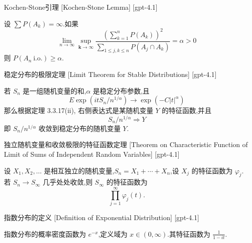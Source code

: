 \documentclass[UTF8]{ctexart}
\begin{document}
    
    
    \begin{lma}
        {Kochen-Stone引理}
        [Kochen-Stone Lemma]
        [gpt-4.1]
        
设 $\sum P(A_k) = \infty$.如果
\[
\lim_{n \to \infty} \sup_{\mathbf{k} \to \infty} \frac{\left( \sum_{k=1}^{n} P(A_k) \right)^2}{\sum_{1 \leq j, k \leq n} P(A_j \cap A_k)} = \alpha > 0
\]
则 $P(A_n\ \text{i.o.}) \geq \alpha$.

    \end{lma}
    
    
    
    \begin{thm}
        {稳定分布的极限定理}
        [Limit Theorem for Stable Distributions]
        [gpt-4.1]
        
若 $S_n$ 是一组随机变量的和,$\alpha$ 是稳定分布参数,且
\[
E \exp ( i t S_n / n^{1/\alpha} ) \to \exp ( - C | t |^{\alpha} )
\]
那么根据定理 3.3.17(ii), 右侧表达式是某随机变量 $Y$ 的特征函数,并且
\[
S_n / n^{1/\alpha} \Rightarrow Y
\]
即 $S_n / n^{1/\alpha}$ 收敛到稳定分布的随机变量 $Y$.

    \end{thm}
    
    
    
    \begin{thm}
        {独立随机变量和收敛极限的特征函数定理}
        [Theorem on Characteristic Function of Limit of Sums of Independent Random Variables]
        [gpt-4.1]
        
设 $X_1, X_2, \dots$ 是相互独立的随机变量,$S_n = X_1 + \cdots + X_n$,设 $X_j$ 的特征函数为 $\varphi_j$.若 $S_n \to S_\infty$ 几乎处处收敛,则 $S_\infty$ 的特征函数为
\[
\prod_{j=1}^\infty \varphi_j(t).
\]

    \end{thm}
    
    
    
    \begin{dfn}
        {指数分布的定义}
        [Definition of Exponential Distribution]
        [gpt-4.1]
        
指数分布的概率密度函数为 $e^{-x}$,定义域为 $x \in (0, \infty)$.其特征函数为 $\frac{1}{1 - i t}$.

    \end{dfn}
    
\end{document}
